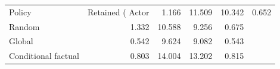 \begin{tabular}{lrrrr}
\toprule
Policy & Retained (%
\midrule
Actor & 1.166 & 11.509 & 10.342 & 0.652\\
Random & 1.332 & 10.588 & 9.256 & 0.675\\
Global & 0.542 & 9.624 & 9.082 & 0.543\\
Conditional factual & 0.803 & 14.004 & 13.202 & 0.815\\
\bottomrule
\end{tabular}

